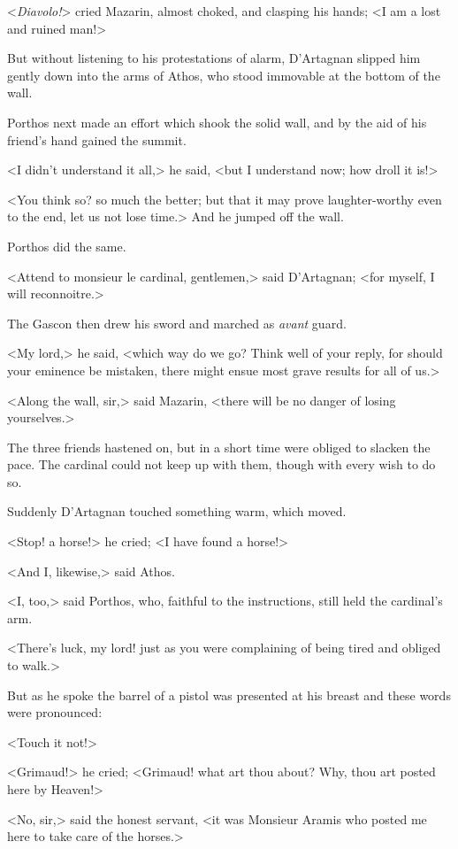 <\textit{Diavolo!}> cried Mazarin, almost choked, and clasping his hands; <I am a lost and ruined man!>

But without listening to his protestations of alarm, D'Artagnan slipped him gently down into the arms of Athos, who stood immovable at the bottom of the wall.

Porthos next made an effort which shook the solid wall, and by the aid of his friend's hand gained the summit.

<I didn't understand it all,> he said, <but I understand now; how droll it is!>

<You think so? so much the better; but that it may prove laughter-worthy even to the end, let us not lose time.> And he jumped off the wall.

Porthos did the same.

<Attend to monsieur le cardinal, gentlemen,> said D'Artagnan; <for myself, I will reconnoitre.>

The Gascon then drew his sword and marched as \textit{avant} guard.

<My lord,> he said, <which way do we go? Think well of your reply, for should your eminence be mistaken, there might ensue most grave results for all of us.>

<Along the wall, sir,> said Mazarin, <there will be no danger of losing yourselves.>

The three friends hastened on, but in a short time were obliged to slacken the pace. The cardinal could not keep up with them, though with every wish to do so.

Suddenly D'Artagnan touched something warm, which moved.

<Stop! a horse!> he cried; <I have found a horse!>

<And I, likewise,> said Athos.

<I, too,> said Porthos, who, faithful to the instructions, still held the cardinal's arm.

<There's luck, my lord! just as you were complaining of being tired and obliged to walk.>

But as he spoke the barrel of a pistol was presented at his breast and these words were pronounced:

<Touch it not!>

<Grimaud!> he cried; <Grimaud! what art thou about? Why, thou art posted here by Heaven!>

<No, sir,> said the honest servant, <it was Monsieur Aramis who posted me here to take care of the horses.>


